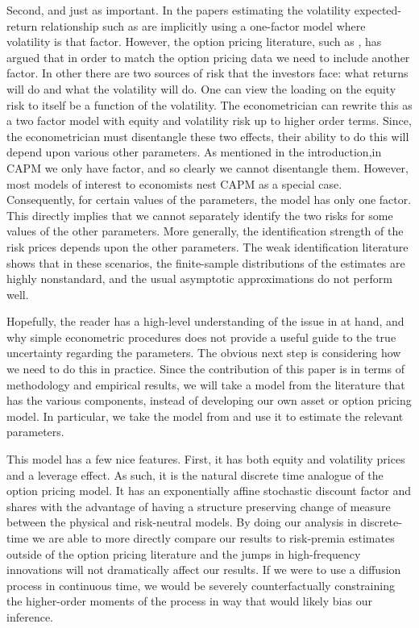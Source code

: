 \documentclass[11pt, letterpaper, twoside, final]{article}
\begin{document}
Second, and just as important.
In the papers estimating the volatility expected-return relationship such as
\textcite{brandt2004relationship,lettau2010measuring} are implicitly using a one-factor model where volatility
is that factor.
However, the option pricing literature, such as  \textcite{christoffersen2013capturing}, has argued that in order
to match the option pricing data we need to include another factor.
In other there are two sources of risk that the investors face: what returns will do and what the volatility
will do.
One can view the loading on the equity risk to itself be a function of the volatility.
The econometrician can rewrite this as a two factor model with equity and volatility risk up to higher order
terms.
Since, the econometrician must disentangle these two effects, their ability to do this will depend upon various
other parameters.
As mentioned in the introduction,in CAPM we only have factor, and so clearly we cannot disentangle them.
However, most models of interest to economists nest CAPM as a special case. 
Consequently, for certain values of the parameters, the model has only one factor. 
This directly implies that we cannot separately identify the two risks for some values of the other parameters.
More generally, the identification strength of the risk prices depends upon the other parameters.
The weak identification literature shows that in these scenarios, the finite-sample distributions of the estimates
are highly nonstandard, and the usual asymptotic approximations do not perform well.


Hopefully, the reader has a high-level understanding of the issue in at hand, and why simple econometric
procedures does not provide a useful guide to the true uncertainty regarding the parameters.
The obvious next step is considering how we need to do this in practice.
Since the contribution of this paper is in terms of methodology and empirical results, we will take a model from
the literature that has the various components, instead of developing our own asset or option pricing model.
In particular, we take the model from \textcite{khrapov2016affine} and use it to estimate the relevant parameters. 

This model has a few nice features. 
First, it has both equity and volatility prices and a leverage effect. 
As such, it is the natural discrete time analogue of the \textcite{heston1993closedform} option pricing model. 
It has an exponentially affine stochastic discount factor  and shares with \textcite{heston1993closedform} the
advantage of having a structure preserving change of measure between the physical and risk-neutral models.
By doing our analysis in discrete-time we are able to more directly compare our results to risk-premia estimates
outside of the option pricing literature and the jumps in high-frequency innovations will not dramatically affect
our results.  
If we were to use a diffusion process in continuous time, we would be severely counterfactually constraining the
higher-order  moments of the process in way that would likely bias our inference. 
\end{document}
